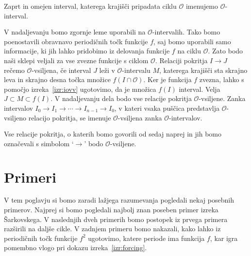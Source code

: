 \documentclass[mat2]{fmfdelo}
\begin{document}
\begin{definicija}
Zaprt in omejen interval, katerega krajišči pripadata ciklu $\mathcal{O}$ imenujemo $\mathcal{O}$-interval. 
\end{definicija}
V nadaljevanju bomo zgornje leme uporabili na $\mathcal{O}$-intervalih. Tako bomo poenostavili obravnavo periodičnih točk funkcije $f$, saj bomo uporabili samo informacije, ki jih lahko pridobimo iz delovanja funkcije $f$ na ciklu $\mathcal{O}$. Zato bodo naši sklepi veljali za vse zvezne funkcije s ciklom $\mathcal{O}$. Relaciji pokritja $I \to J$ rečemo $\mathcal{O}$-vsiljena, če interval $J$ leži v $\mathcal{O}$-intervalu $M$, katerega krajišči sta skrajno leva in skrajno desna točka množice $f(I \cap \mathcal{O})$. Ker je funkcija $f$ zvezna, lahko s pomočjo izreka~\ref{izr:iovv} ugotovimo, da je množica $f(I)$ interval. Velja $J \subset M \subset f(I)$. V nadaljevanju dela bodo vse relacije pokritja $\mathcal{O}$-vsiljene. Zanka intervalov $I_0 \to I_1 \to \cdots \to I_{n-1} \to I_0$, v kateri vsaka puščica predstavlja $\mathcal{O}$-vsiljeno relacijo pokritja, se imenuje $\mathcal{O}$-vsiljena zanka $\mathcal{O}$-intervalov.


Vse relacije pokritja, o katerih bomo govorili od sedaj naprej in jih bomo označevali s simbolom `$\to$' bodo $\mathcal{O}$-vsiljene.

\section{Primeri}
V tem poglavju si bomo zaradi lažjega razumevanja pogledali nekaj posebnih primerov. Najprej si bomo pogledali najbolj znan poseben primer izreka Šarkovskega. V naslednjih dveh primerih bomo postopek iz prvega primera razširili na daljše cikle. V zadnjem primeru bomo nakazali, kako lahko iz periodičnih točk funkcije $f^2$ ugotovimo, katere periode ima funkcija $f$, kar igra pomembno vlogo pri dokazu izreka~\ref{izr:forcing}.
\end{document}
